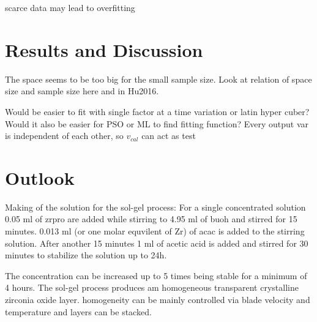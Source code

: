 \documentclass[a4paper]{article}
\begin{document}
scarce data may lead to overfitting\cite{Lecun1995conv}
\section{Results and Discussion}
The space seems to be too big for the small sample size.
Look at relation of space size and sample size here and in Hu2016.

Would be easier to fit with single factor at a time variation or latin hyper cuber?
Would it also be easier for PSO or ML to find fitting function?
Every output var is independent of each other, so $v_{cal}$ can act as test 

\section{Outlook}

Making of the solution for the sol-gel process:
For a single concentrated solution 0.05 ml of \gls{zrpro} are added while stirring to 4.95 ml of \gls{buoh} and stirred for 15 minutes. 
0.013 ml (or one molar equvilent of Zr) of \gls{acac} is added to the stirring solution. 
After another 15 minutes 1 ml of acetic acid is added and stirred for 30 minutes to stabilize the solution up to 24h. 

The concentration can be increased up to 5 times being stable for a minimum of 4 hours. 
The sol-gel process produces am homogeneous transparent crystalline zirconia oxide layer. 
homogeneity can be mainly controlled via blade velocity and temperature and layers can be stacked.



\end{document}
